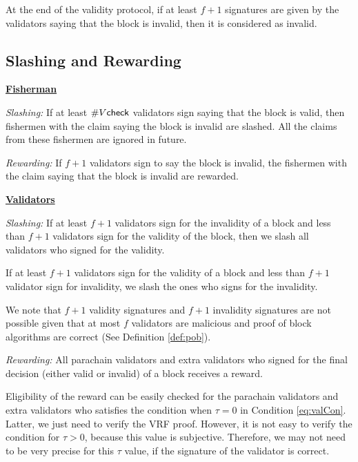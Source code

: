 At the end of the validity protocol, if at least $f+1$ signatures are given by the validators saying that the block is invalid, then it is considered as invalid.
\subsection{Slashing and Rewarding}

\underline{\textbf{Fisherman}} 

\emph{Slashing:} If at least $\#V\mathsf{check}$ validators sign saying that the block is valid, then fishermen with the claim saying the block is invalid are slashed. All the claims from these fishermen are ignored in future.

\emph{Rewarding:} If $f+1$ validators sign to say the block is invalid, the  fishermen with the claim saying that the block is invalid are rewarded.


\noindent\underline{\textbf{Validators}}

\emph{Slashing:} If at least $f+1$ validators sign for the invalidity of a block and less than $f+1$ validators sign for the validity of the block, then we slash all validators who signed for the validity.

If at least $f+1$ validators sign for the validity of a block and less than $f+1$ validator sign for invalidity, we slash the ones who signs for the invalidity.

We note that $f+1$ validity signatures and $f+1$ invalidity signatures are not possible given that at most $f$ validators are malicious and proof of block algorithms  are correct (See Definition \ref{def:pob}).

\emph{Rewarding:} All parachain validators and extra validators who signed for the final decision (either valid or invalid) of a block receives a reward. 

Eligibility of the reward can be easily checked for the parachain validators and extra validators who satisfies the condition when $\tau = 0$ in Condition \ref{eq:valCon}. Latter, we just need to verify the VRF proof.
However, it is not easy to verify the condition for $\tau > 0$, because this value is subjective. Therefore, we may not need to be very precise for this $\tau$ value, if the signature of the validator is correct.